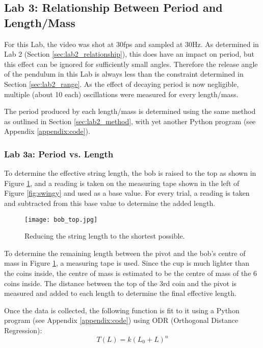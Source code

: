 \documentclass[aps,twocolumn,secnumarabic,nobalancelastpage,amsmath,amssymb,nofootinbib,floatfix,letterpaper]{revtex4}
\begin{document}
\subsection{Lab 3: Relationship Between Period and Length/Mass}
\label{sec:lab3_method}

For this Lab, the video was shot at 30fps and sampled at 30Hz. As determined in Lab 2 (Section \ref{sec:lab2_relationship}),
this does have an impact on period, but this effect can be ignored for sufficiently small angles. Therefore the release
angle of the pendulum in this Lab is always less than the constraint determined in Section \ref{sec:lab2_range}.
As the effect of decaying period is now negligible, multiple (about 10 each) oscillations were measured for every
length/mass.

The period produced by each length/mass is determined using the same method as outlined in Section
\ref{sec:lab2_method}, with yet another Python program (see Appendix \ref{appendix:code}).

\subsubsection{Lab 3a: Period vs. Length}

To determine the effective string length, the bob is raised to the top as shown in Figure \ref{fig:raised_bob}, and a
reading is taken on the measuring tape shown in the left of Figure \ref{fig:swingy} and used as a base value. For
every trial, a reading is taken and subtracted from this base value to determine the added length.

\begin{figure}[htb]
    \texttt{[image: bob\_top.jpg]}
    \caption{Reducing the string length to the shortest possible.}
    \label{fig:raised_bob}
\end{figure}

To determine the remaining length between the pivot and the bob's centre of mass in Figure \ref{fig:raised_bob}, a
measuring tape is used. Since the cup is much lighter than the coins inside, the centre of mass is estimated to be the
centre of mass of the 6 coins inside. The distance between the top of the 3rd coin and the pivot is measured and added
to each length to determine the final effective length.

Once the data is collected, the following function is fit to it using a Python program (see Appendix \ref{appendix:code})
using ODR (Orthogonal Distance Regression):
\begin{equation}
    T(L) = k(L_0 + L)^n
    \label{eqn:period}
\end{equation}
\end{document}
